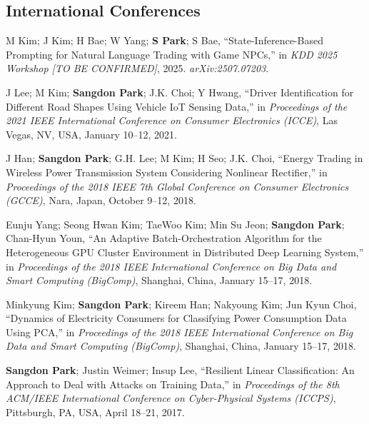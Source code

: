 \documentclass[11pt,a4paper]{article}
\begin{document}
\subsection{International Conferences}

\begin{enumerate}[label={[{\arabic*}]}, leftmargin=*, itemsep=0.3em]

\item M Kim; J Kim; H Bae; W Yang; \textbf{S Park}; S Bae, ``State-Inference-Based Prompting for Natural Language Trading with Game NPCs,'' in \textit{KDD 2025 Workshop [TO BE CONFIRMED]}, 2025. \textit{arXiv:2507.07203}.

\item J Lee; M Kim; \textbf{Sangdon Park}; J.K. Choi; Y Hwang, ``Driver Identification for Different Road Shapes Using Vehicle IoT Sensing Data,'' in \textit{Proceedings of the 2021 IEEE International Conference on Consumer Electronics (ICCE)}, Las Vegas, NV, USA, January 10--12, 2021.

\item J Han; \textbf{Sangdon Park}; G.H. Lee; M Kim; H Seo; J.K. Choi, ``Energy Trading in Wireless Power Transmission System Considering Nonlinear Rectifier,'' in \textit{Proceedings of the 2018 IEEE 7th Global Conference on Consumer Electronics (GCCE)}, Nara, Japan, October 9--12, 2018.

\item Eunju Yang; Seong Hwan Kim; TaeWoo Kim; Min Su Jeon; \textbf{Sangdon Park}; Chan-Hyun Youn, ``An Adaptive Batch-Orchestration Algorithm for the Heterogeneous GPU Cluster Environment in Distributed Deep Learning System,'' in \textit{Proceedings of the 2018 IEEE International Conference on Big Data and Smart Computing (BigComp)}, Shanghai, China, January 15--17, 2018.

\item Minkyung Kim; \textbf{Sangdon Park}; Kireem Han; Nakyoung Kim; Jun Kyun Choi, ``Dynamics of Electricity Consumers for Classifying Power Consumption Data Using PCA,'' in \textit{Proceedings of the 2018 IEEE International Conference on Big Data and Smart Computing (BigComp)}, Shanghai, China, January 15--17, 2018.

\item \textbf{Sangdon Park}; Justin Weimer; Insup Lee, ``Resilient Linear Classification: An Approach to Deal with Attacks on Training Data,'' in \textit{Proceedings of the 8th ACM/IEEE International Conference on Cyber-Physical Systems (ICCPS)}, Pittsburgh, PA, USA, April 18--21, 2017.


\end{enumerate}
\end{document}
